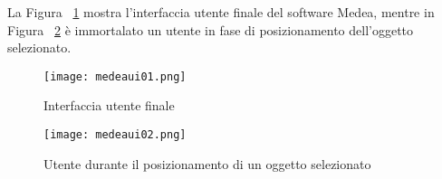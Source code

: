 La Figura ~\ref{label:medeaui01} mostra l'interfaccia utente finale del software Medea, mentre in Figura ~\ref{label:medeaui02} è immortalato un utente in fase di posizionamento dell'oggetto selezionato.
\clearpage

\begin{figure}[Ht]
\centering
\texttt{[image: medeaui01.png]}
\caption{Interfaccia utente finale}
\label{label:medeaui01}
\end{figure}

\begin{figure}[Ht]
\centering
\texttt{[image: medeaui02.png]}
\caption{Utente durante il posizionamento di un oggetto selezionato}
\label{label:medeaui02}
\end{figure}


